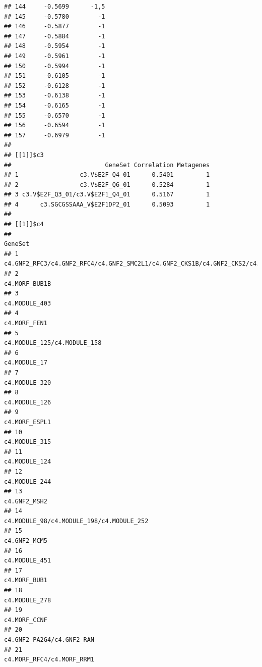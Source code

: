 \documentclass{article}\usepackage[]{graphicx}\usepackage[]{color}
\makeatletter
\newenvironment{kframe}{%
 \def\at@end@of@kframe{}%
 \ifinner\ifhmode%
  \def\at@end@of@kframe{\end{minipage}}%
  \begin{minipage}{\columnwidth}%
 \fi\fi%
 \def\FrameCommand##1{\hskip\@totalleftmargin \hskip-\fboxsep
 \colorbox{shadecolor}{##1}\hskip-\fboxsep
     \hskip-\linewidth \hskip-\@totalleftmargin \hskip\columnwidth}%
 \MakeFramed {\advance\hsize-\width
   \@totalleftmargin\z@ \linewidth\hsize
   \@setminipage}}%
 {\par\unskip\endMakeFramed%
 \at@end@of@kframe}
\newenvironment{knitrout}{}{} %
\makeatother
\begin{document}
\begin{knitrout}
\begin{kframe}
\begin{verbatim}
## 144     -0.5699      -1,5
## 145     -0.5780        -1
## 146     -0.5877        -1
## 147     -0.5884        -1
## 148     -0.5954        -1
## 149     -0.5961        -1
## 150     -0.5994        -1
## 151     -0.6105        -1
## 152     -0.6128        -1
## 153     -0.6138        -1
## 154     -0.6165        -1
## 155     -0.6570        -1
## 156     -0.6594        -1
## 157     -0.6979        -1
## 
## [[1]]$c3
##                          GeneSet Correlation Metagenes
## 1                 c3.V$E2F_Q4_01      0.5401         1
## 2                 c3.V$E2F_Q6_01      0.5284         1
## 3 c3.V$E2F_Q3_01/c3.V$E2F1_Q4_01      0.5167         1
## 4      c3.SGCGSSAAA_V$E2F1DP2_01      0.5093         1
## 
## [[1]]$c4
##                                                                            GeneSet
## 1  c4.GNF2_RFC3/c4.GNF2_RFC4/c4.GNF2_SMC2L1/c4.GNF2_CKS1B/c4.GNF2_CKS2/c4.GNF2_TTK
## 2                                                                    c4.MORF_BUB1B
## 3                                                                    c4.MODULE_403
## 4                                                                     c4.MORF_FEN1
## 5                                                      c4.MODULE_125/c4.MODULE_158
## 6                                                                     c4.MODULE_17
## 7                                                                    c4.MODULE_320
## 8                                                                    c4.MODULE_126
## 9                                                                    c4.MORF_ESPL1
## 10                                                                   c4.MODULE_315
## 11                                                                   c4.MODULE_124
## 12                                                                   c4.MODULE_244
## 13                                                                    c4.GNF2_MSH2
## 14                                        c4.MODULE_98/c4.MODULE_198/c4.MODULE_252
## 15                                                                    c4.GNF2_MCM5
## 16                                                                   c4.MODULE_451
## 17                                                                    c4.MORF_BUB1
## 18                                                                   c4.MODULE_278
## 19                                                                    c4.MORF_CCNF
## 20                                                       c4.GNF2_PA2G4/c4.GNF2_RAN
## 21                                                       c4.MORF_RFC4/c4.MORF_RRM1

\end{verbatim}
\end{kframe}
\end{knitrout}
\end{document}
